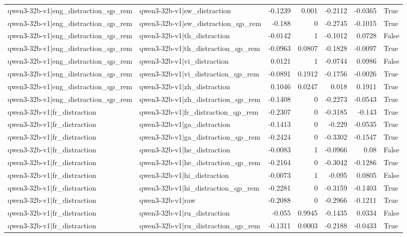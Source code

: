 \begin{table}
\begin{tabular}{l l r r r r l}
qwen3-32b-v1|eng_distraction_qp_rem & qwen3-32b-v1|sw_distraction & -0.1239 & 0.001 & -0.2112 & -0.0365 & True \\
qwen3-32b-v1|eng_distraction_qp_rem & qwen3-32b-v1|sw_distraction_qp_rem & -0.188 & 0 & -0.2745 & -0.1015 & True \\
qwen3-32b-v1|eng_distraction_qp_rem & qwen3-32b-v1|th_distraction & -0.0142 & 1 & -0.1012 & 0.0728 & False \\
qwen3-32b-v1|eng_distraction_qp_rem & qwen3-32b-v1|th_distraction_qp_rem & -0.0963 & 0.0807 & -0.1828 & -0.0097 & True \\
qwen3-32b-v1|eng_distraction_qp_rem & qwen3-32b-v1|vi_distraction & 0.0121 & 1 & -0.0744 & 0.0986 & False \\
qwen3-32b-v1|eng_distraction_qp_rem & qwen3-32b-v1|vi_distraction_qp_rem & -0.0891 & 0.1912 & -0.1756 & -0.0026 & True \\
qwen3-32b-v1|eng_distraction_qp_rem & qwen3-32b-v1|zh_distraction & 0.1046 & 0.0247 & 0.018 & 0.1911 & True \\
qwen3-32b-v1|eng_distraction_qp_rem & qwen3-32b-v1|zh_distraction_qp_rem & -0.1408 & 0 & -0.2273 & -0.0543 & True \\
qwen3-32b-v1|fr_distraction & qwen3-32b-v1|fr_distraction_qp_rem & -0.2307 & 0 & -0.3185 & -0.143 & True \\
qwen3-32b-v1|fr_distraction & qwen3-32b-v1|ga_distraction & -0.1413 & 0 & -0.229 & -0.0535 & True \\
qwen3-32b-v1|fr_distraction & qwen3-32b-v1|ga_distraction_qp_rem & -0.2424 & 0 & -0.3302 & -0.1547 & True \\
qwen3-32b-v1|fr_distraction & qwen3-32b-v1|he_distraction & -0.0083 & 1 & -0.0966 & 0.08 & False \\
qwen3-32b-v1|fr_distraction & qwen3-32b-v1|he_distraction_qp_rem & -0.2164 & 0 & -0.3042 & -0.1286 & True \\
qwen3-32b-v1|fr_distraction & qwen3-32b-v1|hi_distraction & -0.0073 & 1 & -0.095 & 0.0805 & False \\
qwen3-32b-v1|fr_distraction & qwen3-32b-v1|hi_distraction_qp_rem & -0.2281 & 0 & -0.3159 & -0.1403 & True \\
qwen3-32b-v1|fr_distraction & qwen3-32b-v1|raw & -0.2088 & 0 & -0.2966 & -0.1211 & True \\
qwen3-32b-v1|fr_distraction & qwen3-32b-v1|ru_distraction & -0.055 & 0.9945 & -0.1435 & 0.0334 & False \\
qwen3-32b-v1|fr_distraction & qwen3-32b-v1|ru_distraction_qp_rem & -0.1311 & 0.0003 & -0.2188 & -0.0433 & True \\

\end{tabular}
\end{table}
